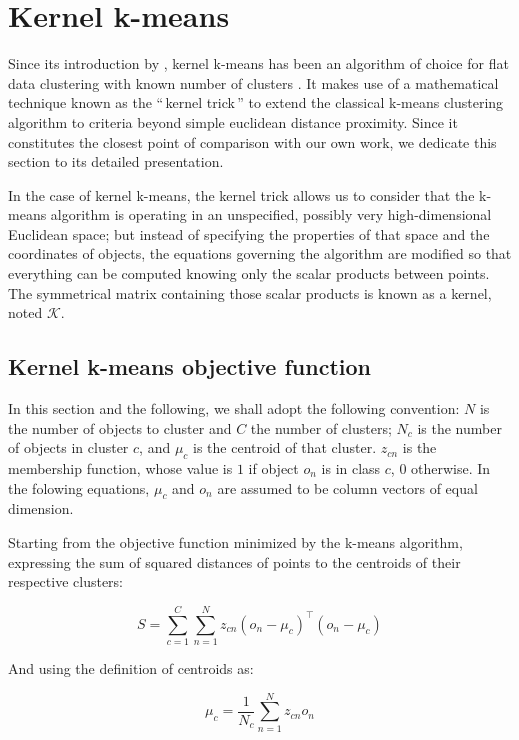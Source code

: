 \documentclass[10pt,letterpaper]{article}
\newcommand{\gl}[1]{``\,#1\,''} %
\begin{document}
\section{Kernel k-means} \label{sec:kkmeans}

Since its introduction by \cite{Girolami:2002:MKC:2325785.2326903}, kernel k-means has been an algorithm of choice for flat data clustering with known number of clusters \cite{Kulis2008, Roth:2003:OCP:960254.960291}. It makes use of a mathematical technique known as the \gl{kernel trick} to extend the classical k-means clustering algorithm \cite{macQueenBsmsp67} to criteria beyond simple euclidean distance proximity. Since it constitutes the closest point of comparison with our own work, we dedicate this section to its detailed presentation.

In the case of kernel k-means, the kernel trick allows us to  consider that the k-means algorithm is operating in an unspecified, possibly very high-dimensional Euclidean space; but instead of specifying the properties of that space and the coordinates of objects, the equations governing the algorithm are modified so that everything can be computed knowing only the scalar products between points. The symmetrical matrix  containing those scalar products is known as a kernel, noted $\mathcal{K}$.

\subsection{Kernel k-means objective function}

In this section and the following, we shall adopt the following convention: $N$ is the number of objects to cluster and $C$ the number of clusters; $N_c$ is the number of objects in cluster $c$, and $\mu_c$ is the centroid of that cluster. $z_{cn}$ is the membership function, whose value is $1$ if object $o_n$ is in class $c$, $0$ otherwise. In the folowing equations, $\mu_c$ and $o_n$ are assumed to be column vectors of equal dimension.

Starting from the objective function minimized by the k-means algorithm, expressing the sum of squared distances of points to the centroids of their respective clusters:

\[
S = \sum_{c=1}^{C} \sum_{n=1}^{N} z_{cn} \left(o_n-\mu_c\right)^\top\left(o_n-\mu_c\right) \label{eq:S}
\]

And using the definition of centroids as:

\[
\mu_c = \frac{1}{N_c}\sum_{n=1}^{N}z_{cn}o_n
\]
\end{document}
